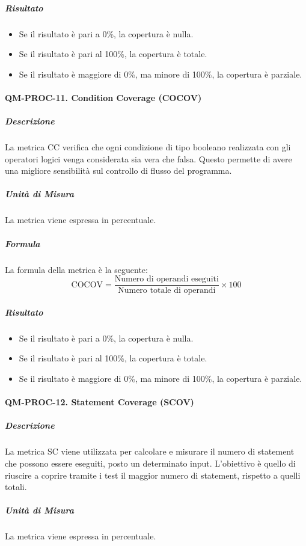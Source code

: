 			\subparagraph{Risultato}
			\begin{itemize}
				\item Se il risultato è pari a 0\%, la copertura è nulla.
				\item Se il risultato è pari al 100\%, la copertura è totale.
				\item Se il risultato è maggiore di 0\%, ma minore di 100\%, la copertura è parziale.
			\end{itemize}

		\paragraph{QM-PROC-11. Condition Coverage (COCOV)}

			\subparagraph{Descrizione}
			La metrica CC verifica che ogni condizione di tipo booleano realizzata con gli operatori logici venga considerata sia vera che falsa. Questo permette di avere una migliore sensibilità sul controllo di flusso del programma.

			\subparagraph{Unità di Misura}
			La metrica viene espressa in percentuale.

			\subparagraph{Formula}
			La formula della metrica è la seguente:
			\[
				\text{COCOV} = \frac{\text{Numero di operandi eseguiti}}{\text{Numero totale di operandi}} \times 100
			\]

			\subparagraph{Risultato}
			\begin{itemize}
				\item Se il risultato è pari a 0\%, la copertura è nulla.
				\item Se il risultato è pari al 100\%, la copertura è totale.
				\item Se il risultato è maggiore di 0\%, ma minore di 100\%, la copertura è parziale.
			\end{itemize}

		\paragraph{QM-PROC-12. Statement Coverage (SCOV)}

			\subparagraph{Descrizione}
			La metrica SC viene utilizzata per calcolare e misurare il numero di statement che possono essere eseguiti, posto un determinato input. L'obiettivo è quello di riuscire a coprire tramite i test il maggior numero di statement, rispetto a quelli totali.

			\subparagraph{Unità di Misura}
			La metrica viene espressa in percentuale.

